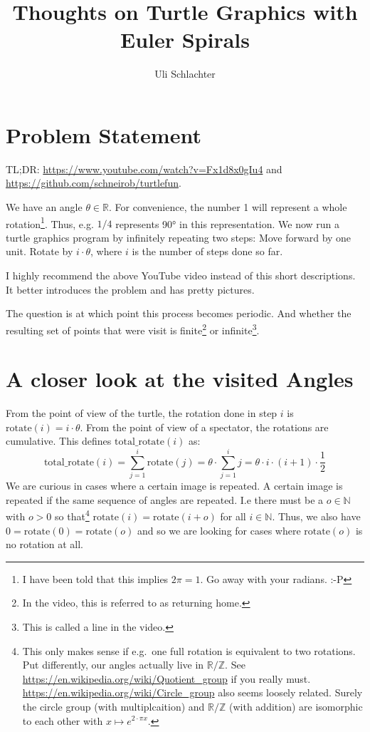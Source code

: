 \documentclass[pdftex,a4paper]{scrartcl}
\title{Thoughts on Turtle Graphics with Euler Spirals}
\author{Uli Schlachter}
\newcommand{\rotate}{\text{rotate}}
\newcommand{\total}{\text{total\_rotate}}
\begin{document}
\maketitle

\section{Problem Statement}
TL;DR: \url{https://www.youtube.com/watch?v=Fx1d8x0gIu4} and \url{https://github.com/schneirob/turtlefun}.

We have an angle \(\theta\in\mathbb{R}\). For convenience, the number 1 will represent a whole rotation\footnote{I have
been told that this implies \(2\pi = 1\). Go away with your radians. :-P}. Thus, e.g. \(1/4\) represents 90° in this
representation. We now run a turtle graphics program by infinitely repeating two steps: Move forward by one unit. Rotate
by \(i\cdot\theta\), where \(i\) is the number of steps done so far.

I highly recommend the above YouTube video instead of this short descriptions. It better introduces the problem and has
pretty pictures.

The question is at which point this process becomes periodic. And whether the resulting set of points that were visit is
finite\footnote{In the video, this is referred to as returning home.} or infinite\footnote{This is called a line in the
video.}.

\section{A closer look at the visited Angles}
From the point of view of the turtle, the rotation done in step \(i\) is \(\rotate(i)=i\cdot\theta\). From the point of
view of a spectator, the rotations are cumulative. This defines \(\total(i)\) as:
\[
\total(i)=\sum_{j=1}^i \rotate(j) = \theta\cdot\sum_{j=1}^i j = \theta\cdot i\cdot(i+1)\cdot\frac{1}{2}
\]
We are curious in cases where a certain image is repeated. A certain image is repeated if the same sequence of angles
are repeated.
I.e there must be a \(o\in\mathbb{N}\) with \(o>0\) so that\footnote{This only makes sense if e.g.\ one full rotation is
equivalent to two rotations. Put differently, our angles actually live in \(\mathbb{R}/\mathbb{Z}\). See
\url{https://en.wikipedia.org/wiki/Quotient_group} if you really must. \url{https://en.wikipedia.org/wiki/Circle_group}
also seems loosely related. Surely the circle group (with multiplcaition) and \(\mathbb{R}/\mathbb{Z}\) (with addition)
are isomorphic to each other with \(x\mapsto e^{2\cdot\pi x}\).} \(\rotate(i)=\rotate(i+o)\) for all \(i\in\mathbb{N}\). Thus, we also have
\(0=\rotate(0)=\rotate(o)\) and so we are looking for cases where \(\rotate(o)\) is no rotation at all.
\end{document}

